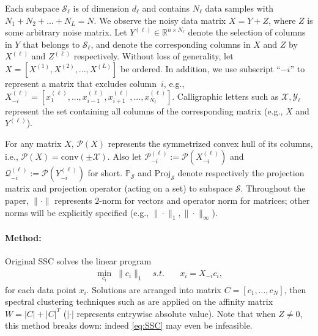 \documentclass[twoside,11pt]{article}
\numberwithin{equation}{section}
\begin{document}
Each subspace $\mathcal{S}_{\ell}$ is of dimension $d_{\ell}$ and contains $N_{\ell}$ data samples with $N_1 +N_2+...+N_L=N$. We observe the noisy data matrix $X = Y+Z$, where $Z$ is some arbitrary noise matrix. Let $Y^{(\ell)}\in \mathbb{R}^{n\times N_{\ell}}$ denote the selection of columns in $Y$ that belongs to $\mathcal{S}_{\ell}$, and denote the corresponding columns in $X$ and $Z$  by $X^{(\ell)}$ and $Z^{(\ell)}$ respectively. Without loss of generality, let $X=[X^{(1)},X^{(2)},...,X^{(L)}]$ be ordered. In addition, we use subscript ``$-i$'' to represent a matrix that excludes column~$i$, e.g., $X^{(\ell)}_{-i}=[x^{(\ell)}_1,...,x^{(\ell)}_{i-1},x^{(\ell)}_{i+1},...,x^{(\ell)}_{N_{\ell}}].$ Calligraphic letters such as $\mathcal{X},\mathcal{Y_{\ell}}$ represent the set containing all columns of the corresponding matrix (e.g., $X$ and $Y^{(\ell)}$).

For any matrix $X$, $\mathcal{P}(X)$ represents the symmetrized convex hull of its columns, i.e., $\mathcal{P}(X) = \mathrm{conv}(\pm \mathcal{X})$. Also let $\mathcal{P}_{-i}^{(\ell)} := \mathcal{P}(X_{-i}^{(\ell)})$ and $\mathcal{Q}_{-i}^{(\ell)} := \mathcal{P}(Y_{-i}^{(\ell)})$ for short. $\mathbb{P}_{\mathcal{S}}$ and $\mathrm{Proj}_{\mathcal{S}}$ denote respectively the projection matrix and projection operator (acting on a set) to subspace $\mathcal{S}$. Throughout the paper, $\|\cdot\|$ represents $2$-norm for vectors and operator norm for matrices; other norms will be explicitly specified (e.g., $\|\cdot\|_1,\|\cdot\|_{\infty}$).

\paragraph{Method: }
Original SSC solves the linear program
    \begin{equation}\label{eq:SSC}
    \begin{aligned}
    \min_{c_i} \; \|c_i\|_1 \quad s.t. \quad &x_i=X_{-i}c_i,
    \end{aligned}
    \end{equation}
for each data point $x_i$. Solutions are arranged into matrix $C=[c_1,...,c_N]$, then spectral clustering techniques such as \citet{ng2002spectral} are applied on the affinity matrix $W=|C|+|C|^T$ ($|\cdot|$ represents entrywise absolute value). Note that when $Z\neq 0$, this method breaks down: indeed \eqref{eq:SSC} may even be infeasible.
\end{document}
